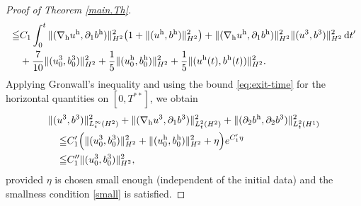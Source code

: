 \documentclass[11pt]{amsart}
\theoremstyle{definition}
\newcommand{\dt}{\,{\rm d}t}
\numberwithin{equation}{section}
\begin{document}
\begin{proof}[Proof of Theorem \ref{main.Th}]
\begin{align*}
		\leqq&C_1\int_{0}^{t}\|(\nabla_{\mathrm{h}} u^\mathrm{h},\partial_1b^\mathrm{h})\|_{H^2}^2\bigl(1+\|(u^\mathrm{h},b^\mathrm{h})\|_{H^2}^2\bigr)+\|(\nabla_{\mathrm{h}} u^\mathrm{h},\partial_1b^\mathrm{h})\|_{H^2}^2\|(u^3,b^3)\|_{H^2}^2\dt'\\
		&+\frac{7}{10}\|(u^3_0,b^3_0)\|^2_{H^2}+\frac15\|(u^\mathrm{h}_0,b^\mathrm{h}_0)\|_{H^{2}}^2+\frac15\|(u^\mathrm{h}(t),b^\mathrm{h}(t))\|_{H^{2}}^2.
	\end{align*}
	Applying Gronwall's inequality and using the bound \eqref{eq:exit-time} for the horizontal quantities on $[0,T^{**}]$, we obtain
	\begin{align}\label{eq:vert-final-bound}
		\|(u^3&,b^3)\|^2_{L_{t}^{\infty}(H^2)}+\|(\nabla_{\mathrm{h}} u^3,\partial_1b^3)\|^2_{L_{t}^{2}(H^2)}+\|(\partial_2b^\mathrm{h},\partial_2b^3)\|_{L_{t}^{2}(H^1)}^2\nonumber\\
		\leqq& C_1'\Bigl(\|(u^3_0,b^3_0)\|^2_{H^2}+\|(u^\mathrm{h}_0,b^\mathrm{h}_0)\|_{H^{2}}^2+\eta\Bigr)e^{C_1'\eta}\nonumber\\
		\leqq& C_1''\|(u^3_0,b^3_0)\|^2_{H^2},
	\end{align}
	provided $\eta$ is chosen small enough (independent of the initial data) and the smallness condition \eqref{small} is satisfied.
	

\end{proof}
\end{document}
